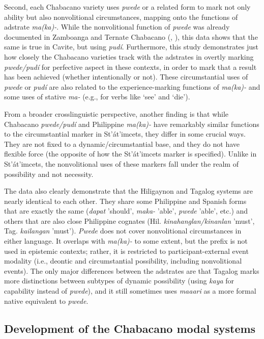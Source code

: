 \documentclass[output=paper]{langsci/langscibook}
\begin{document}
Second, each Chabacano variety uses \textit{pwede} or a related form to mark not only ability but also nonvolitional circumstances, mapping onto the functions of adstrate \textit{ma(ka)-}. While the nonvolitional function of \textit{pwede} was already documented in Zamboanga and Ternate Chabacano (\citealt{Rubino2008}, \citealt{Sippola2011}), this data shows that the same is true in Cavite, but using \textit{pudí}. Furthermore, this study demonstrates just how closely the Chabacano varieties track with the adstrates in overtly marking \textit{pwede/pudí} for perfective aspect in these contexts, in order to mark that a result has been achieved (whether intentionally or not). These circumstantial uses of \textit{pwede} or \textit{pudí} are also related to the experience-marking functions of \textit{ma(ka)-} and some uses of stative \textit{ma-} (e.g., for verbs like ‘see’ and ‘die’). 

From a broader crosslinguistic perspective, another finding is that while Chabacano \textit{pwede/pudí} and Philippine \textit{ma(ka)-} have remarkably similar functions to the circumstantial marker in St’át’imcets, they differ in some crucial ways. They are not fixed to a dynamic/circumstantial base, and they do not have flexible force (the opposite of how the St’át’imcets marker is specified). Unlike in St’át’imcets, the nonvolitional uses of these markers fall under the realm of possibility and not necessity.

The data also clearly demonstrate that the Hiligaynon and Tagalog systems are nearly identical to each other. They share some Philippine and Spanish forms that are exactly the same (\textit{dapat} {}'should', \textit{maka-} 'able', \textit{pwede} 'able', etc.) and others that are also close Philippine cognates (Hil. \textit{kinahanglan/kinanlan} 'must', Tag. \textit{kailangan} 'must'). \textit{Pwede} does not cover nonvolitional circumstances in either language. It overlaps with \textit{ma(ka)-} to some extent, but the prefix is not used in epistemic contexts; rather, it is restricted to participant-external event modality (i.e., deontic and circumstantial possibility, including nonvolitional events). The only major differences between the adstrates are that Tagalog marks more distinctions between subtypes of dynamic possibility (using \textit{kaya} for capability instead of \textit{pwede}), and it still sometimes uses \textit{maaari} as a more formal native equivalent to \textit{pwede}.

\subsection{Development of the Chabacano modal systems}
\end{document}
